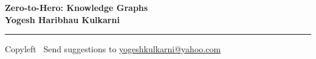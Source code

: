 
\graphicspath{{images/}}

\footnotesize


\begin{center}
\Large{\textbf{Zero-to-Hero: Knowledge Graphs\\ Yogesh Haribhau Kulkarni}}  
\end{center}

\begin{multicols}{2}


\end{multicols}

\rule{\linewidth}{0.25pt}
\scriptsize
Copyleft \textcopyleft\  Send suggestions to 
\href{http://www.yogeshkulkarni.com}{yogeshkulkarni@yahoo.com}


